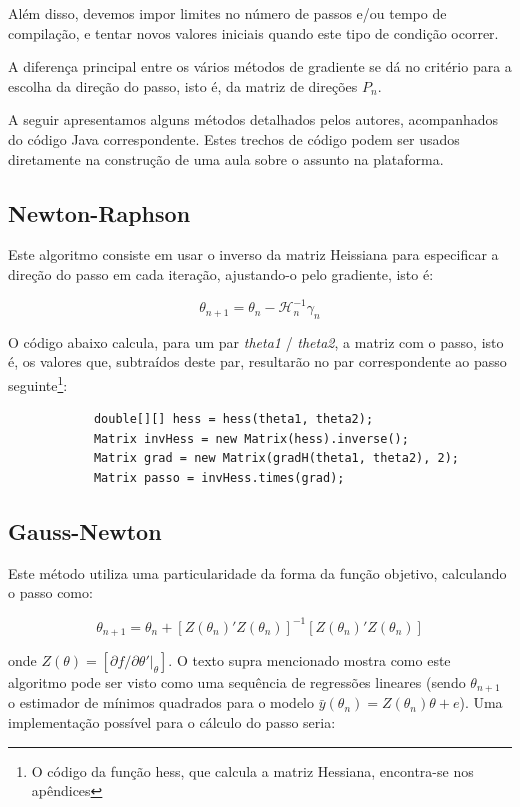 \documentclass{abnt}
\newenvironment{mylisting}
{\begin{list}{}{\setlength{\leftmargin}{1em}}\item\scriptsize\bfseries}
{\end{list}}
\begin{document}
Além disso, devemos impor limites no número de passos e/ou tempo de compilação, e tentar novos valores iniciais quando este tipo de condição ocorrer.

A diferença principal entre os vários métodos de gradiente se dá no critério para a escolha da direção do passo, isto é, da matriz de direções $P_n$.

A seguir apresentamos alguns métodos detalhados pelos autores, acompanhados do código Java correspondente. Estes trechos de código podem ser usados diretamente na construção de uma aula sobre o assunto na plataforma.

\subsection{Newton-Raphson}

Este algoritmo consiste em usar o inverso da matriz Heissiana para especificar a direção do passo em cada iteração, ajustando-o pelo gradiente, isto é:

\[ \theta_{n+1} = \theta_{n} - \mathcal{H}_{n}^{-1}\gamma_{n} \]

O código abaixo calcula, para um par \textit{theta1} / \textit{theta2}, a matriz com o passo, isto é, os valores que, subtraídos deste par, resultarão no par correspondente ao passo seguinte\footnote{O código da função hess, que calcula a matriz Hessiana, encontra-se nos apêndices}:

\begin{mylisting}
\begin{verbatim}
			double[][] hess = hess(theta1, theta2);
			Matrix invHess = new Matrix(hess).inverse();
			Matrix grad = new Matrix(gradH(theta1, theta2), 2);
			Matrix passo = invHess.times(grad);
\end{verbatim}
\end{mylisting}

\subsection{Gauss-Newton}

Este método utiliza uma particularidade da forma da função objetivo, calculando o passo como:

\[ \theta_{n+1} = \theta_{n} + [Z(\theta_n)'Z(\theta_n)]^{-1}[Z(\theta_n)'Z(\theta_n)] \]

onde $Z(\theta)=[\partial f/ \partial \theta'\vert_{\theta}]$. O texto supra mencionado mostra como este algoritmo pode ser visto como uma sequência de regressões lineares (sendo $\theta_{n+1}$ o estimador de mínimos quadrados para o modelo $\bar y(\theta_{n})=Z(\theta_{n})\theta + e$). Uma implementação possível para o cálculo do passo seria:
\end{document}
